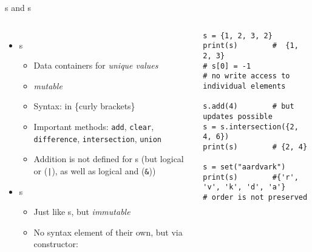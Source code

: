 \begin{frame}[fragile]{s and s}
%
\begin{columns}[T]
\begin{itemize}
\item {}s
	\begin{itemize}
	\item Data containers for \emph{unique values}
	\item \emph{mutable}
	\item Syntax: in \{curly brackets\}
	\item Important methods: \texttt{add}, \texttt{clear}, \texttt{difference}, \texttt{intersection}, \texttt{union}
	\item Addition is not defined for s (but logical or (\texttt{|}), as well as logical and (\texttt{\&}))
	\end{itemize}
\item {}s
	\begin{itemize}
	\item Just like s, but \emph{immutable}
	\item No syntax element of their own, but via constructor: 
	\end{itemize}
\end{itemize}
%
\begin{codebox}
\begin{verbatim}
s = {1, 2, 3, 2}
print(s)        #  {1, 2, 3}
# s[0] = -1     
# no write access to individual elements

s.add(4)        # but updates possible
s = s.intersection({2, 4, 6})
print(s)        # {2, 4}

s = set("aardvark")
print(s)        #{'r', 'v', 'k', 'd', 'a'}
# order is not preserved
\end{verbatim}
\end{codebox}
\end{columns}
%
\end{frame}


